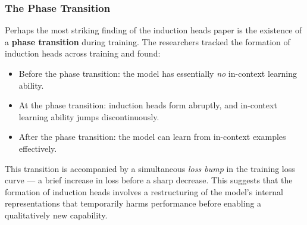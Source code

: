 \documentclass[11pt, a4paper]{article}
\theoremstyle{definition}
\theoremstyle{plain}
\begin{document}
\begin{center}
\end{center}

\subsubsection{The Phase Transition}

Perhaps the most striking finding of the induction heads paper is the
existence of a \textbf{phase transition} during training.  The researchers
tracked the formation of induction heads across training and found:

\begin{itemize}[leftmargin=2em]
  \item Before the phase transition: the model has essentially \emph{no}
    in-context learning ability.
  \item At the phase transition: induction heads form abruptly, and
    in-context learning ability jumps discontinuously.
  \item After the phase transition: the model can learn from in-context
    examples effectively.
\end{itemize}

This transition is accompanied by a simultaneous \emph{loss bump} in the
training loss curve --- a brief increase in loss before a sharp decrease.
This suggests that the formation of induction heads involves a
restructuring of the model's internal representations that temporarily
harms performance before enabling a qualitatively new capability.
\end{document}
